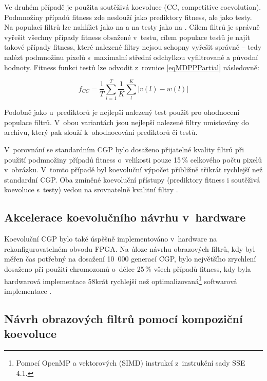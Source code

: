 Ve druhém případě je použita soutěživá koevoluce (CC, competitive coevolution). Podmnožiny případů fitness zde neslouží jako prediktory fitness, ale jako testy. Na populaci filtrů lze nahlížet jako na  a na testy jako na . Cílem filtrů je správně vyřešit všechny případy fitness obsažené v~testu, cílem populace testů je najít takové případy fitness, které nalezené filtry nejsou schopny vyřešit správně -- tedy nalézt podmnožinu pixelů s~maximalní střední odchylkou vyfiltrované a původní hodnoty. Fitness funkci testů lze odvodit z~rovnice \ref{eqMDPPPartial} následovně:

\begin{equation}
    \label{eqFtestsIF}
    f_{\mathit{CC}} = \frac{1}{T} \sum\limits_{i=1}^{T} \frac{1}{K} \sum\limits_l^K \left| v\left( l \right) - w\left( l \right) \right|
\end{equation}

Podobně jako u~prediktorů je nejlepší nalezený test použit pro ohodnocení populace filtrů. V~obou variantách jsou nejlepší nalezené filtry umisťovány do archivu, který pak slouží k~ohodnocování prediktorů či testů.

V~porovnání se standardním CGP bylo dosaženo přijatelné kvality filtrů při použití podmnožiny případů fitness o~velikosti pouze 15\,\% celkového počtu pixelů v~obrázku. V~tomto případě byl koevoluční výpočet přibližně třikrát rychlejší než standardní CGP. Oba zmíněné koevoluční přístupy (prediktory fitness i soutěživá koevoluce s~testy) vedou na srovnatelně kvalitní filtry \cite{SikuPPSN}.

\subsection{Akcelerace koevolučního návrhu v~hardware}

Koevoluční CGP bylo také úspěšně implementováno v~hardware na rekonfigurovatelném obvodu FPGA. Na úloze návrhu obrazových filtrů, kdy byl měřen čas potřebný na dosažení 10~000 generací CGP, bylo největšího zrychlení dosaženo při použití chromozomů o~délce 25\,\% všech případů fitness, kdy byla hardwarová implementace 58krát rychlejší než optimalizovaná\footnote{Pomocí OpenMP a vektorových (SIMD) instrukcí z~instrukční sady SSE 4.1.} softwarová implementace \cite{Hrbacek}.

\subsection{Návrh obrazových filtrů pomocí kompoziční koevoluce}

